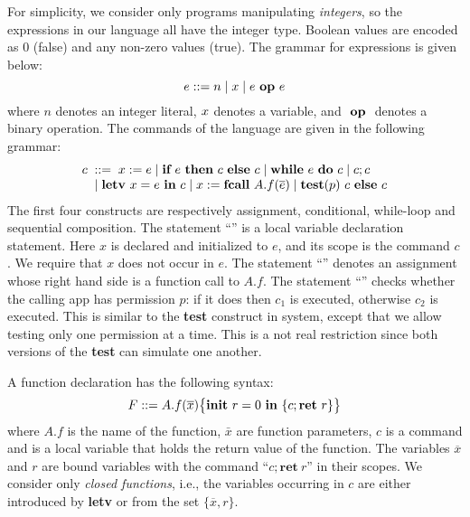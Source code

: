 For simplicity, we consider only programs manipulating \emph{integers}, so the expressions in our language all have the integer type. Boolean values are encoded as 0 (false) and any non-zero values (true). The grammar for expressions is given below:
\begin{equation*}
e ::= n \mid x \mid {e}~\textbf{op}~{e}
\end{equation*}
where $n$ denotes an integer literal, $x$ denotes a variable, and ${}~\textbf{op}~{}$ denotes a binary operation.
The commands of the language are given in the following grammar:
\begin{equation*}
\begin{array}{l}
  c\;::=\; {x}:={e} \mid {\textbf{if}~{e}~\textbf{then}~{c}~\textbf{else}~{c}} \mid  \textbf{while}~{e}~\textbf{do}~{c} \mid {c};{c}  \\
  \quad \mid {\textbf{letv}~ {x} = {e} ~\textbf{in}~ {c}} \mid {x}:=\textbf{fcall}~{A.f}({\overline{e}}) \mid {\textbf{test}({p})~{c} ~\textbf{else}~ {c}}
\end{array}
\end{equation*}
The first four constructs are respectively assignment, conditional, while-loop and sequential composition.
The statement ``'' is a local variable declaration statement. Here $x$ is
declared and initialized to $e$, and its scope is the command $c$. We require
that $x$ does not occur in $e.$
The statement ``''  denotes an assignment whose right hand side is
a function call to $A.f$. The statement
``''
checks whether the calling app has permission $p$: if it does then $c_1$ is executed,
otherwise $c_2$ is executed.
This is similar to the \textbf{test} construct in {\BN} system, except that we allow testing only
one permission at a time. This is a not real restriction since both versions of the \textbf{test} can simulate one another.


A function declaration has the following syntax:
\begin{equation*}
F ::= {A.f}(\overline{x})\big\{{{\textbf{init}~ {{r}}=0 ~\textbf{in}~\{{c};\textbf{ret}~{{r}}\}}}\big\}
\end{equation*}
where $A.f$ is the name of the function, $\bar x$ are function parameters,
$c$ is a command and {\lpRES} is a local variable
that holds the return value of the function.
The variables $\overline{x}$ and $r$ are bound variables with the command ``$c; \textbf{ret}~r$'' in their scopes.
We consider only {\em closed functions}, i.e., the variables occurring in $c$
are either introduced by \textbf{letv} or from the set $\{\overline{x}, r\}$.



